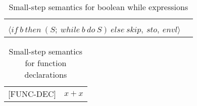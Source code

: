 \begin{table}[H]
    \centering
    \begin{longtable}[c] { r c }
    
    \begin{tabular}{@{}c@{}} 
    [WHILE] \\
    \newline
    \end{tabular} 
  \begin{tabular}{@{}c@{}}   \(
  \langle while \ b \ do \ S, \ sto, \ envl \rangle \Rightarrow
  \)  \\ \(
  \langle if \ b \ then \ (S; \ while \ b \ do \ S) \ else \ skip, \ sto, \ envl \rangle
  \) 
  \end{tabular}
        
 \end{longtable}
    \caption{Small-step semantics for boolean while expressions}\label{sem:while}
\end{table}

\begin{longtable}[c]{ r c}
  [FUNC-DEC] & \(x + x\)
  \caption{Small-step semantics for function declarations}
\end{longtable}